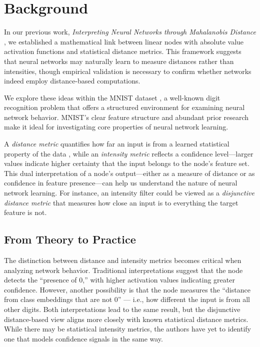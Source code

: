 \section{Background}

In our previous work, \textit{Interpreting Neural Networks through Mahalanobis Distance} \citep{oursland2024interpreting}, we established a mathematical link between linear nodes with absolute value activation functions and statistical distance metrics. This framework suggests that neural networks may naturally learn to measure distances rather than intensities, though empirical validation is necessary to confirm whether networks indeed employ distance-based computations.

We explore these ideas within the MNIST dataset \citep{lecun1998gradient}, a well-known digit recognition problem that offers a structured environment for examining neural network behavior. MNIST's clear feature structure and abundant prior research make it ideal for investigating core properties of neural network learning.

A \emph{distance metric} quantifies how far an input is from a learned statistical property of the data \citep{deza2009encyclopedia}, while an \emph{intensity metric} reflects a confidence level—larger values indicate higher certainty that the input belongs to the node's feature set. This dual interpretation of a node's output—either as a measure of distance or as confidence in feature presence—can help us understand the nature of neural network learning. For instance, an intensity filter could be viewed as a \emph{disjunctive distance metric} that measures how close an input is to everything the target feature is not.

\subsection{From Theory to Practice}

The distinction between distance and intensity metrics becomes critical when analyzing network behavior. Traditional interpretations suggest that the node detects the “presence of 0,” with higher activation values indicating greater confidence. However, another possibility is that the node measures the “distance from class embeddings that are not 0” — i.e., how different the input is from all other digits. Both interpretations lead to the same result, but the disjunctive distance-based view aligns more closely with known statistical distance metrics. While there may be statistical intensity metrics, the authors have yet to identify one that models confidence signals in the same way.


